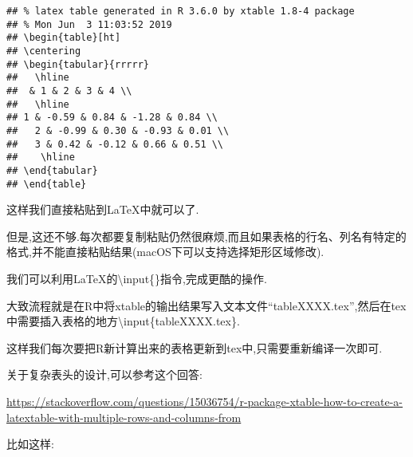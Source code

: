 \documentclass[]{ctexbook}
\begin{document}
\begin{verbatim}
## % latex table generated in R 3.6.0 by xtable 1.8-4 package
## % Mon Jun  3 11:03:52 2019
## \begin{table}[ht]
## \centering
## \begin{tabular}{rrrrr}
##   \hline
##  & 1 & 2 & 3 & 4 \\ 
##   \hline
## 1 & -0.59 & 0.84 & -1.28 & 0.84 \\ 
##   2 & -0.99 & 0.30 & -0.93 & 0.01 \\ 
##   3 & 0.42 & -0.12 & 0.66 & 0.51 \\ 
##    \hline
## \end{tabular}
## \end{table}
\end{verbatim}

这样我们直接粘贴到LaTeX中就可以了.

但是,这还不够.每次都要复制粘贴仍然很麻烦,而且如果表格的行名、列名有特定的格式,并不能直接粘贴结果(macOS下可以支持选择矩形区域修改).

我们可以利用LaTeX的\textbackslash{}input\{\}指令,完成更酷的操作.

大致流程就是在R中将xtable的输出结果写入文本文件``tableXXXX.tex'',然后在tex中需要插入表格的地方\textbackslash{}input\{tableXXXX.tex\}.

这样我们每次要把R新计算出来的表格更新到tex中,只需要重新编译一次即可.

关于复杂表头的设计,可以参考这个回答:

\url{https://stackoverflow.com/questions/15036754/r-package-xtable-how-to-create-a-latextable-with-multiple-rows-and-columns-from}

比如这样:
\end{document}
